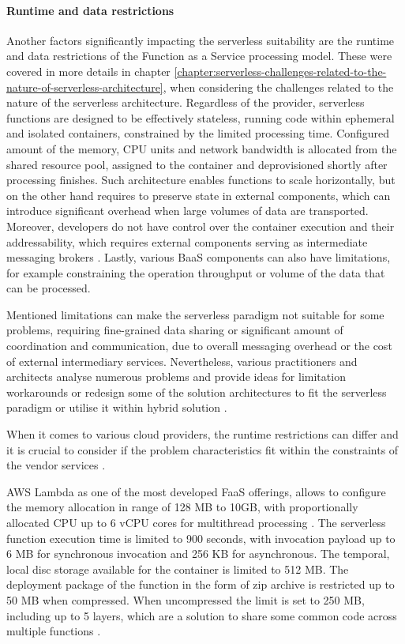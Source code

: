 \paragraph{Runtime and data restrictions}

Another factors significantly impacting the serverless suitability are the runtime and data restrictions of the Function as a Service processing model. These were covered in more details in chapter \ref{chapter:serverless-challenges-related-to-the-nature-of-serverless-architecture}, when considering the challenges related to the nature of the serverless architecture.
Regardless of the provider, serverless functions are designed to be effectively stateless, running code within ephemeral and isolated containers, constrained by the limited processing time. Configured amount of the memory, CPU units and network bandwidth is allocated from the shared resource pool, assigned to the container and deprovisioned shortly after processing finishes.
Such architecture enables functions to scale horizontally, but on the other hand requires to preserve state in external components, which can introduce significant overhead when large volumes of data are transported.
Moreover, developers do not have control over the container execution and their addressability, which requires external components serving as intermediate messaging brokers \cite{MartinFowlerServerless}. Lastly, various BaaS components can also have limitations, for example constraining the operation throughput or volume of the data that can be processed.

Mentioned limitations can make the serverless paradigm not suitable for some problems, requiring fine-grained data sharing or significant amount of coordination and communication, due to overall messaging overhead or the cost of external intermediary services.
Nevertheless, various practitioners and architects analyse numerous problems and provide ideas for limitation workarounds or redesign some of the solution architectures to fit the serverless paradigm or utilise it within hybrid solution \cite{BerkeleyServerless}.

When it comes to various cloud providers, the runtime restrictions can differ and it is crucial to consider if the problem characteristics fit within the constraints of the vendor services \cite{LeveragingServerlessCloudComputingArchitectures}.

AWS Lambda \cite{AWSLambdaQuotas} as one of the most developed FaaS offerings, allows to configure the memory allocation in range of 128 MB to 10GB, with proportionally allocated CPU up to 6 vCPU cores for multithread processing \cite{AWSLambdaRAMandCPU}.
The serverless function execution time is limited to 900 seconds, with invocation payload up to 6 MB for synchronous invocation and 256 KB for asynchronous.
The temporal, local disc storage available for the container is limited to 512 MB.
The deployment package of the function in the form of zip archive is restricted up to 50 MB when compressed. When uncompressed the limit is set to 250 MB, including up to 5 layers, which are a solution to share some common code across multiple functions \cite{EvaluationOfServerlessApplicationProgrammingModel}.

